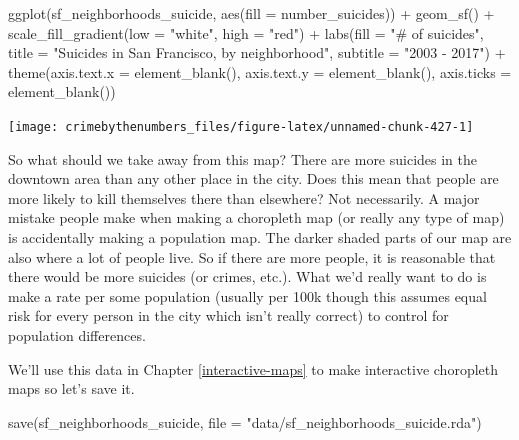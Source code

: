 \documentclass[
]{krantz}
\makeatletter
\newenvironment{Shaded}{\begin{snugshade}}{\end{snugshade}}
\newcommand{\AttributeTok}[1]{\textcolor[rgb]{0.61,0.61,0.61}{#1}}
\newcommand{\FunctionTok}[1]{\textcolor[rgb]{0,0,0}{#1}}
\newcommand{\NormalTok}[1]{#1}
\newcommand{\SpecialCharTok}[1]{\textcolor[rgb]{0,0,0}{#1}}
\newcommand{\StringTok}[1]{\textcolor[rgb]{0.5,0.5,0.5}{#1}}
\newenvironment{kframe}{%
\medskip{}
\setlength{\fboxsep}{.8em}
 \def\at@end@of@kframe{}%
 \ifinner\ifhmode%
  \def\at@end@of@kframe{\end{minipage}}%
  \begin{minipage}{\columnwidth}%
 \fi\fi%
 \def\FrameCommand##1{\hskip\@totalleftmargin \hskip-\fboxsep
 \colorbox{shadecolor}{##1}\hskip-\fboxsep
     \hskip-\linewidth \hskip-\@totalleftmargin \hskip\columnwidth}%
 \MakeFramed {\advance\hsize-\width
   \@totalleftmargin\z@ \linewidth\hsize
   \@setminipage}}%
 {\par\unskip\endMakeFramed%
 \at@end@of@kframe}
\renewenvironment{Shaded}{\begin{kframe}}{\end{kframe}}
\makeatother
\begin{document}
\begin{Shaded}
\begin{Highlighting}[]
\FunctionTok{ggplot}\NormalTok{(sf\_neighborhoods\_suicide, }\FunctionTok{aes}\NormalTok{(}\AttributeTok{fill =}\NormalTok{ number\_suicides)) }\SpecialCharTok{+}
  \FunctionTok{geom\_sf}\NormalTok{() }\SpecialCharTok{+}
  \FunctionTok{scale\_fill\_gradient}\NormalTok{(}\AttributeTok{low =} \StringTok{"white"}\NormalTok{, }\AttributeTok{high =} \StringTok{"red"}\NormalTok{) }\SpecialCharTok{+}
  \FunctionTok{labs}\NormalTok{(}\AttributeTok{fill =} \StringTok{"\# of suicides"}\NormalTok{,}
       \AttributeTok{title =} \StringTok{"Suicides in San Francisco, by neighborhood"}\NormalTok{,}
       \AttributeTok{subtitle =} \StringTok{"2003 {-} 2017"}\NormalTok{) }\SpecialCharTok{+}
  \FunctionTok{theme}\NormalTok{(}\AttributeTok{axis.text.x =} \FunctionTok{element\_blank}\NormalTok{(),}
        \AttributeTok{axis.text.y =} \FunctionTok{element\_blank}\NormalTok{(),}
        \AttributeTok{axis.ticks =} \FunctionTok{element\_blank}\NormalTok{())}
\end{Highlighting}
\end{Shaded}

\begin{center}\texttt{[image: crimebythenumbers\_files/figure-latex/unnamed-chunk-427-1]} \end{center}

So what should we take away from this map? There are more suicides in the downtown area than any other place in the city. Does this mean that people are more likely to kill themselves there than elsewhere? Not necessarily. A major mistake people make when making a choropleth map (or really any type of map) is accidentally making a population map. The darker shaded parts of our map are also where a lot of people live. So if there are more people, it is reasonable that there would be more suicides (or crimes, etc.). What we'd really want to do is make a rate per some population (usually per 100k though this assumes equal risk for every person in the city which isn't really correct) to control for population differences.

We'll use this data in Chapter \ref{interactive-maps} to make interactive choropleth maps so let's save it.

\begin{Shaded}
\begin{Highlighting}[]
\FunctionTok{save}\NormalTok{(sf\_neighborhoods\_suicide, }\AttributeTok{file =} \StringTok{"data/sf\_neighborhoods\_suicide.rda"}\NormalTok{)}
\end{Highlighting}
\end{Shaded}
\end{document}
